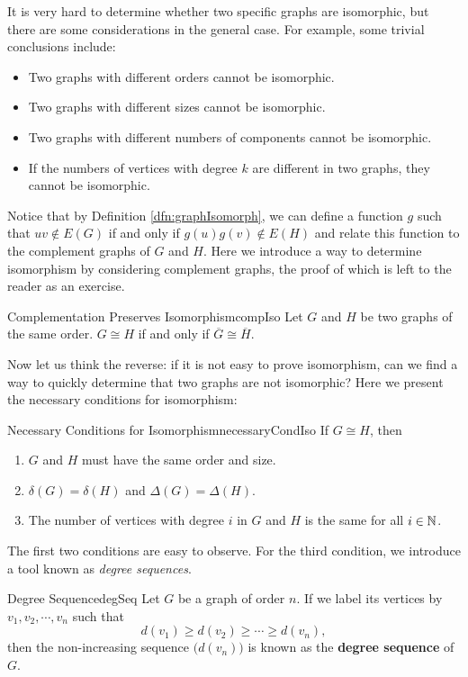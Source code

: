 \documentclass[math, code]{amznotes}
\theoremstyle{remark}
\begin{document}
It is very hard to determine whether two specific graphs are isomorphic, but there are some considerations in the general case. For example, some trivial conclusions include:
\begin{itemize}
    \item Two graphs with different orders cannot be isomorphic.
    \item Two graphs with different sizes cannot be isomorphic.
    \item Two graphs with different numbers of components cannot be isomorphic.
    \item If the numbers of vertices with degree $k$ are different in two graphs, they cannot be isomorphic.
\end{itemize}
Notice that by Definition \ref{dfn:graphIsomorph}, we can define a function $g$ such that $uv \notin E(G)$ if and only if $g(u)g(v) \notin E(H)$ and relate this function to the complement graphs of $G$ and $H$. Here we introduce a way to determine isomorphism by considering complement graphs, the proof of which is left to the reader as an exercise.
\begin{thmbox}{Complementation Preserves Isomorphism}{compIso}
    Let $G$ and $H$ be two graphs of the same order. $G \cong H$ if and only if $\overline{G} \cong \overline{H}$.
\end{thmbox}
Now let us think the reverse: if it is not easy to prove isomorphism, can we find a way to quickly determine that two graphs are not isomorphic? Here we present the necessary conditions for isomorphism:
\begin{thmbox}{Necessary Conditions for Isomorphism}{necessaryCondIso}
    If $G \cong H$, then
    \begin{enumerate}
        \item $G$ and $H$ must have the same order and size.
        \item $\delta(G) = \delta(H)$ and $\Delta(G) = \Delta(H)$.
        \item The number of vertices with degree $i$ in $G$ and $H$ is the same for all $i \in \mathbb{N}$.
    \end{enumerate}
\end{thmbox}
The first two conditions are easy to observe. For the third condition, we introduce a tool known as \textit{degree sequences}.
\begin{dfnbox}{Degree Sequence}{degSeq}
    Let $G$ be a graph of order $n$. If we label its vertices by $v_1, v_2, \cdots, v_n$ such that
    \begin{equation*}
        d(v_1) \geq d(v_2) \geq \cdots \geq d(v_n),
    \end{equation*}
    then the non-increasing sequence $\bigl(d(v_n)\bigr)$ is known as the {\color{red} \textbf{degree sequence}} of $G$.
\end{dfnbox}
\end{document}
